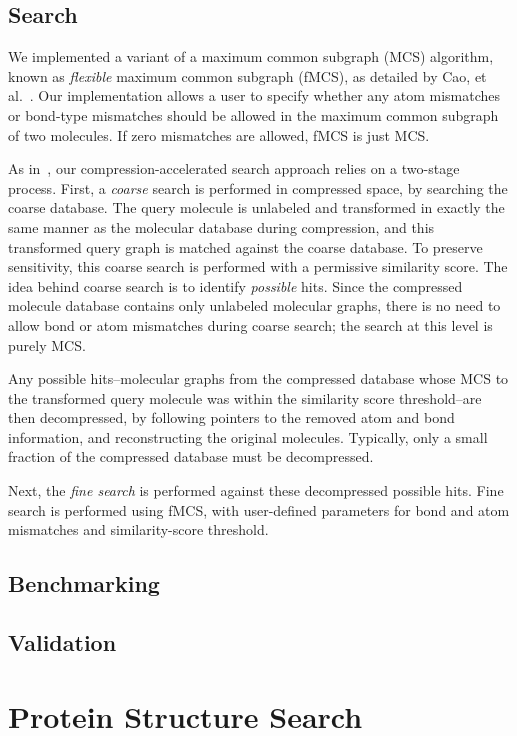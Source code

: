 \documentclass{amsbook}
\theoremstyle{definition}
\theoremstyle{remark}
\numberwithin{equation}{section}
\begin{document}
\subsection*{Search}

We implemented a variant of a maximum common subgraph (MCS) algorithm, known as \emph{flexible} maximum
common subgraph (fMCS), as detailed by Cao, et al.~\cite{cao}.
Our implementation allows a user to specify whether any atom mismatches or bond-type mismatches should be 
allowed in the maximum common subgraph of two molecules.
If zero mismatches are allowed, fMCS is just MCS.

As in~\cite{loh}, our compression-accelerated search approach relies on a two-stage process.
First, a \emph{coarse} search is performed in compressed space, by searching the coarse database.
The query molecule is unlabeled and transformed in exactly the same manner as the molecular database
during compression, and this transformed query graph is matched against the coarse database.
To preserve sensitivity, this coarse search is performed with a permissive similarity score.
The idea behind coarse search is to identify \emph{possible} hits.
Since the compressed molecule database contains only unlabeled molecular graphs, there is no need to
allow bond or atom mismatches during coarse search; the search at this level is purely MCS.

Any possible hits--molecular graphs from the compressed database whose MCS to the transformed
query molecule was within the similarity score threshold--are then decompressed, by following
pointers to the removed atom and bond information, and reconstructing the original molecules.
Typically, only a small fraction of the compressed database must be decompressed.

Next, the \emph{fine search} is performed against these decompressed possible hits.
Fine search is performed using fMCS, with user-defined parameters for bond and atom mismatches and
similarity-score threshold.

\subsection*{Benchmarking}

\subsection*{Validation}

\section*{Protein Structure Search}
\end{document}
